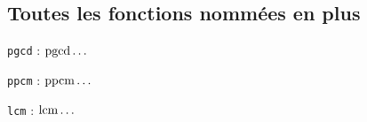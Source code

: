 \documentclass[12pt,a4paper]{article}
\begin{document}




\subsection{Toutes les fonctions nommées en plus} \label{tnsarith-all-named-functions}

\vspace{-1em}

\begin{multicols}{2}
    \verb+pgcd+ : $\operatorname{\operatorname{pgcd}}\dots$

    \verb+ppcm+ : $\operatorname{\operatorname{ppcm}}\dots$

    \verb+lcm+ : $\operatorname{\operatorname{lcm}}\dots$
\end{multicols}
\end{document}
